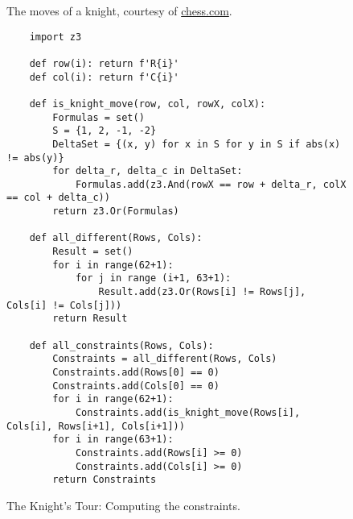 \begin{figure}[!ht]
  \centering
  \caption{The moves of a knight, courtesy of \href{https://www.chess.com/}{chess.com}.}
  \label{fig:knight-moves.png}
\end{figure}

\begin{figure}[!ht]
\centering
\begin{verbatim}
    import z3
               
    def row(i): return f'R{i}'
    def col(i): return f'C{i}'
    
    def is_knight_move(row, col, rowX, colX):
        Formulas = set()
        S = {1, 2, -1, -2}
        DeltaSet = {(x, y) for x in S for y in S if abs(x) != abs(y)}
        for delta_r, delta_c in DeltaSet:
            Formulas.add(z3.And(rowX == row + delta_r, colX == col + delta_c))
        return z3.Or(Formulas)
            
    def all_different(Rows, Cols):
        Result = set()
        for i in range(62+1):
            for j in range (i+1, 63+1):
                Result.add(z3.Or(Rows[i] != Rows[j], Cols[i] != Cols[j]))
        return Result
            
    def all_constraints(Rows, Cols):
        Constraints = all_different(Rows, Cols)
        Constraints.add(Rows[0] == 0)
        Constraints.add(Cols[0] == 0)
        for i in range(62+1):
            Constraints.add(is_knight_move(Rows[i], Cols[i], Rows[i+1], Cols[i+1]))
        for i in range(63+1):
            Constraints.add(Rows[i] >= 0) 
            Constraints.add(Cols[i] >= 0) 
        return Constraints
\end{verbatim}
\vspace*{-0.3cm}
\caption{The Knight's Tour: Computing the constraints.}
\label{fig:Knight's Tour with Z3.ipynb-1}
\end{figure}



